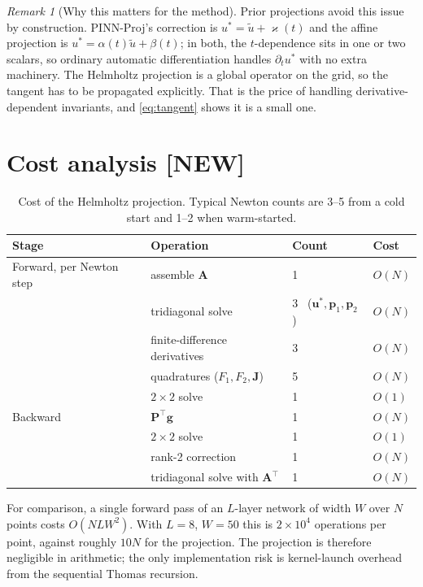 \documentclass[11pt,a4paper]{article}
\theoremstyle{remark}
\newtheorem{remark}{Remark}
\newcommand{\ut}{\tilde{u}}
\newcommand{\us}{u^{*}}
\begin{document}
\begin{remark}[Why this matters for the method]
Prior projections avoid this issue by construction. PINN-Proj's correction is
$\us = \ut + \varkappa(t)$ and the affine projection is
$\us = \alpha(t)\ut + \beta(t)$; in both, the $t$-dependence sits in one or two
scalars, so ordinary automatic differentiation handles $\partial_t\us$ with no
extra machinery. The Helmholtz projection is a global operator on the grid, so
the tangent has to be propagated explicitly. That is the price of handling
derivative-dependent invariants, and \eqref{eq:tangent} shows it is a small
one.
\end{remark}

\section{Cost analysis \textbf{[NEW]}}

\begin{table}[h]
\centering
\begin{tabular}{llll}
\toprule
Stage & Operation & Count & Cost \\
\midrule
Forward, per Newton step
 & assemble $\bm{A}$              & 1 & $O(N)$ \\
 & tridiagonal solve              & 3 \ ($\bm\us,\bm p_1,\bm p_2$) & $O(N)$ \\
 & finite-difference derivatives  & 3 & $O(N)$ \\
 & quadratures ($F_1,F_2,\bm{J}$) & 5 & $O(N)$ \\
 & $2\times2$ solve               & 1 & $O(1)$ \\
\midrule
Backward
 & $\bm{P}^\top\bm{g}$            & 1 & $O(N)$ \\
 & $2\times2$ solve               & 1 & $O(1)$ \\
 & rank-2 correction              & 1 & $O(N)$ \\
 & tridiagonal solve with $\bm{A}^\top$ & 1 & $O(N)$ \\
\bottomrule
\end{tabular}
\caption{Cost of the Helmholtz projection. Typical Newton counts are 3--5 from a
cold start and 1--2 when warm-started.}
\end{table}

\noindent
For comparison, a single forward pass of an $L$-layer network of width $W$ over
$N$ points costs $O(NLW^2)$. With $L=8$, $W=50$ this is $2\times10^4$ operations
per point, against roughly $10N$ for the projection. The projection is therefore
negligible in arithmetic; the only implementation risk is kernel-launch overhead
from the sequential Thomas recursion.
\end{document}
